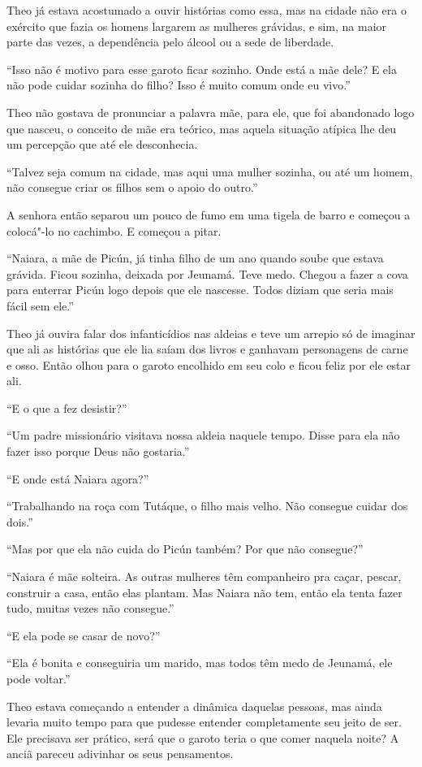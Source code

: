 Theo já estava acostumado a ouvir histórias como essa, mas na cidade não
era o exército que fazia os homens largarem as mulheres grávidas, e sim,
na maior parte das vezes, a dependência pelo álcool ou a sede de
liberdade.

``Isso não é motivo para esse garoto ficar sozinho. Onde está a mãe
dele? E ela não pode cuidar sozinha do filho? Isso é muito comum onde eu
vivo.''

Theo não gostava de pronunciar a palavra mãe, para ele, que foi
abandonado logo que nasceu, o conceito de mãe era teórico, mas aquela
situação atípica lhe deu um percepção que até ele desconhecia.

``Talvez seja comum na cidade, mas aqui uma mulher sozinha, ou até um
homem, não consegue criar os filhos sem o apoio do outro.''

A senhora então separou um pouco de fumo em uma tigela de barro e
começou a colocá"-lo no cachimbo. E começou a pitar.

``Naiara, a mãe de Picún, já tinha filho de um ano quando soube que
estava grávida. Ficou sozinha, deixada por Jeunamá. Teve medo. Chegou a
fazer a cova para enterrar Picún logo depois que ele nascesse. Todos
diziam que seria mais fácil sem ele.''

Theo já ouvira falar dos infanticídios nas aldeias e teve um arrepio só
de imaginar que ali as histórias que ele lia saíam dos livros e ganhavam
personagens de carne e osso. Então olhou para o garoto encolhido em seu
colo e ficou feliz por ele estar ali.

``E o que a fez desistir?''

``Um padre missionário visitava nossa aldeia naquele tempo. Disse para
ela não fazer isso porque Deus não gostaria.''

``E onde está Naiara agora?''

``Trabalhando na roça com Tutáque, o filho mais velho. Não consegue
cuidar dos dois.''

``Mas por que ela não cuida do Picún também? Por que não consegue?''

``Naiara é mãe solteira. As outras mulheres têm companheiro pra caçar,
pescar, construir a casa, então elas plantam. Mas Naiara não tem, então
ela tenta fazer tudo, muitas vezes não consegue.''

``E ela pode se casar de novo?''

``Ela é bonita e conseguiria um marido, mas todos têm medo de Jeunamá,
ele pode voltar.''

Theo estava começando a entender a dinâmica daquelas pessoas, mas ainda
levaria muito tempo para que pudesse entender completamente seu jeito de
ser. Ele precisava ser prático, será que o garoto teria o que comer
naquela noite? A anciã pareceu adivinhar os seus pensamentos.

